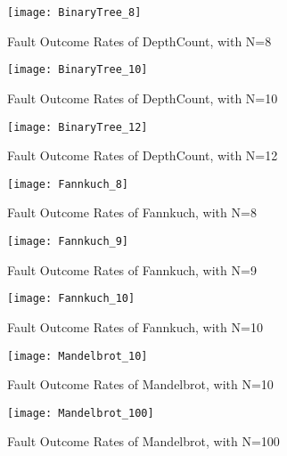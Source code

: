 \begin{figure}[htbp]
  \centering
  \texttt{[image: BinaryTree\_8]}
  \caption{Fault Outcome Rates of DepthCount, with N=8}
  \label{fig:BinaryTree_8}
\end{figure}

\begin{figure}[htbp]
  \centering
  \texttt{[image: BinaryTree\_10]}
  \caption{Fault Outcome Rates of DepthCount, with N=10}
  \label{fig:BinaryTree_10}
\end{figure}

\begin{figure}[htbp]
  \centering
  \texttt{[image: BinaryTree\_12]}
  \caption{Fault Outcome Rates of DepthCount, with N=12}
  \label{fig:BinaryTree_12}
\end{figure}

\begin{figure}[htbp]
  \centering
  \texttt{[image: Fannkuch\_8]}
  \caption{Fault Outcome Rates of Fannkuch, with N=8}
  \label{fig:Fannkuch_8}
\end{figure}

\begin{figure}[htbp]
  \centering
  \texttt{[image: Fannkuch\_9]}
  \caption{Fault Outcome Rates of Fannkuch, with N=9}
  \label{fig:Fannkuch_9}
\end{figure}

\begin{figure}[htbp]
  \centering
  \texttt{[image: Fannkuch\_10]}
  \caption{Fault Outcome Rates of Fannkuch, with N=10}
  \label{fig:Fannkuch_10}
\end{figure}

\begin{figure}[htbp]
  \centering
  \texttt{[image: Mandelbrot\_10]}
  \caption{Fault Outcome Rates of Mandelbrot, with N=10}
  \label{fig:Mandelbrot_10}
\end{figure}

\begin{figure}[htbp]
  \centering
  \texttt{[image: Mandelbrot\_100]}
  \caption{Fault Outcome Rates of Mandelbrot, with N=100}
  \label{fig:Mandelbrot_100}
\end{figure}

